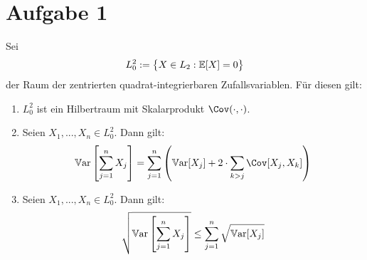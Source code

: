 \documentclass[12pt,a4paper]{article}
\author{Willi Sontopski}
\begin{document}

\section*{Aufgabe 1}
Sei
\begin{align*}
L_0^2:=\big\lbrace X\in L_2:\mathbb{E}[X]=0\big\rbrace
\end{align*}
der Raum der zentrierten quadrat-integrierbaren Zufallsvariablen. Für diesen gilt:
\begin{enumerate}[label=\alph*)]
\item $L_0^2$ ist ein Hilbertraum mit Skalarprodukt $\Cov(\cdot,\cdot)$.
\item Seien $X_1,...,X_n\in L_0^2$. Dann gilt:
\begin{align*}
\Var\left[\sum\limits_{j=1}^n X_j\right]
=\sum\limits_{j=1}^n\left(\Var[X_j]+2\cdot\sum\limits_{k>j}\Cov[X_j,X_k]\right)
\end{align*}
\item Seien $X_1,...,X_n\in L_0^2$. Dann gilt:
\begin{align*}
\sqrt{\mathbb{V}\text{ar}\left[\sum\limits_{j=1}^n X_j\right]}\leq\sum\limits_{j=1}^n\sqrt{\mathbb{V}\text{ar}[X_j]}
\end{align*}
\end{enumerate}
\end{document}

